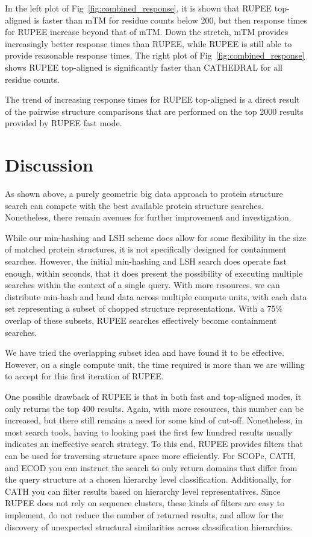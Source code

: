 \documentclass[10pt,letterpaper]{article}
\renewcommand{\figurename}{Fig}
\begin{document}
In the left plot of \figurename~\ref{fig:combined_response}, it is shown that RUPEE top-aligned is faster than mTM for residue counts below 200, but then response times for RUPEE increase beyond that of mTM. 
Down the stretch, mTM provides increasingly better response times than RUPEE, while RUPEE is still able to provide reasonable response times. 
The right plot of \figurename~\ref{fig:combined_response} shows RUPEE top-aligned is significantly faster than CATHEDRAL for all residue counts. 

The trend of increasing response times for RUPEE top-aligned is a direct result of the pairwise structure comparisons that are performed on the top 2000 results provided by RUPEE fast mode.

\section*{Discussion}

As shown above, a purely geometric big data approach to protein structure search can compete with the best available protein structure searches.
Nonetheless, there remain avenues for further improvement and investigation. 

While our min-hashing and LSH scheme does allow for some flexibility in the size of matched protein structures, it is not specifically designed for containment searches. 
However, the initial min-hashing and LSH search does operate fast enough, within seconds, that it does present the possibility of executing multiple searches within the context of a single query. 
With more resources, we can distribute min-hash and band data across multiple compute units, with each data set representing a subset of chopped structure representations. 
With a 75\% overlap of these subsets, RUPEE searches effectively become containment searches. 

We have tried the overlapping subset idea and have found it to be effective. 
However, on a single compute unit, the time required is more than we are willing to accept for this first iteration of RUPEE. 

One possible drawback of RUPEE is that in both fast and top-aligned modes, it only returns the top 400 results. 
Again, with more resources, this number can be increased, but there still remains a need for some kind of cut-off. 
Nonetheless, in most search tools, having to looking past the first few hundred results usually indicates an ineffective search strategy.
To this end, RUPEE provides filters that can be used for traversing structure space more efficiently. 
For SCOPe, CATH, and ECOD you can instruct the search to only return domains that differ from the query structure at a chosen hierarchy level classification. 
Additionally, for CATH you can filter results based on hierarchy level representatives. 
Since RUPEE does not rely on sequence clusters, these kinds of filters are easy to implement, do not reduce the number of returned results, and allow for the discovery of unexpected structural similarities across classification hierarchies.  
\end{document}
